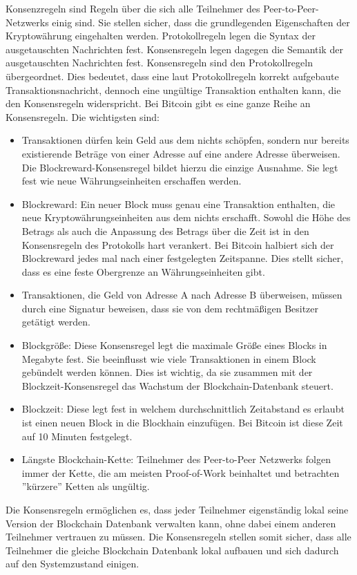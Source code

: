 Konsenzregeln sind Regeln über die sich alle Teilnehmer des Peer-to-Peer-Netzwerks einig sind. Sie stellen sicher, dass die grundlegenden Eigenschaften der Kryptowährung eingehalten werden. 
\if
Protokollregeln legen die Syntax der ausgetauschten Nachrichten fest. Konsensregeln legen dagegen die Semantik der ausgetauschten Nachrichten fest. 
Konsensregeln sind den Protokollregeln übergeordnet. Dies bedeutet, dass eine laut Protokollregeln korrekt aufgebaute Transaktionsnachricht, dennoch eine ungültige Transaktion enthalten kann, die den Konsensregeln widerspricht.
\fi
Bei Bitcoin gibt es eine ganze Reihe an Konsensregeln. Die wichtigsten sind:
\begin{itemize}
\item Transaktionen dürfen kein Geld aus dem nichts schöpfen, sondern nur bereits existierende Beträge von einer Adresse auf eine andere Adresse überweisen. Die Blockreward-Konsensregel bildet hierzu die einzige Ausnahme. Sie legt fest wie neue Währungseinheiten erschaffen werden.
\item Blockreward: Ein neuer Block muss genau eine Transaktion enthalten, die neue Kryptowährungseinheiten aus dem nichts erschafft. Sowohl die Höhe des Betrags als auch die Anpassung des Betrags über die Zeit ist in den Konsensregeln des Protokolls hart verankert. Bei Bitcoin halbiert sich der Blockreward jedes mal nach einer festgelegten Zeitspanne. Dies stellt sicher, dass es eine feste Obergrenze an Währungseinheiten gibt.
\item Transaktionen, die Geld von Adresse A nach Adresse B überweisen, müssen durch eine Signatur beweisen, dass sie von dem rechtmäßigen Besitzer getätigt werden.
\item Blockgröße: Diese Konsensregel legt die maximale Größe eines Blocks in Megabyte fest. Sie beeinflusst wie viele Transaktionen in einem Block gebündelt werden können. Dies ist wichtig, da sie zusammen mit der Blockzeit-Konsensregel das Wachstum der Blockchain-Datenbank steuert.
\item Blockzeit: Diese legt fest in welchem durchschnittlich Zeitabstand es erlaubt ist einen neuen Block in die Blockhain einzufügen. Bei Bitcoin ist diese Zeit auf 10 Minuten festgelegt.
\item Längste Blockchain-Kette: Teilnehmer des Peer-to-Peer Netzwerks folgen immer der Kette, die am meisten Proof-of-Work beinhaltet und betrachten ''kürzere'' Ketten als ungültig.
\end{itemize}
Die Konsensregeln ermöglichen es, dass jeder Teilnehmer eigenständig lokal seine Version der Blockchain Datenbank verwalten kann, ohne dabei einem anderen Teilnehmer vertrauen zu müssen. Die Konsensregeln stellen somit sicher, dass alle Teilnehmer die gleiche Blockchain Datenbank lokal aufbauen und sich dadurch auf den Systemzustand einigen.


